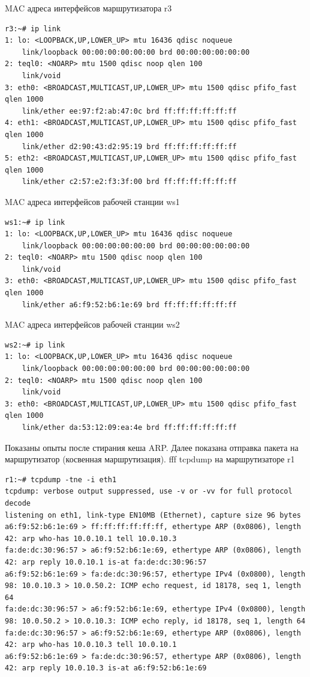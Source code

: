 \documentclass[a4paper,12pt]{article}
\begin{document}
MAC адреса интерфейсов маршрутизатора r3
\begin{Verbatim}
r3:~# ip link
1: lo: <LOOPBACK,UP,LOWER_UP> mtu 16436 qdisc noqueue 
    link/loopback 00:00:00:00:00:00 brd 00:00:00:00:00:00
2: teql0: <NOARP> mtu 1500 qdisc noop qlen 100
    link/void 
3: eth0: <BROADCAST,MULTICAST,UP,LOWER_UP> mtu 1500 qdisc pfifo_fast qlen 1000
    link/ether ee:97:f2:ab:47:0c brd ff:ff:ff:ff:ff:ff
4: eth1: <BROADCAST,MULTICAST,UP,LOWER_UP> mtu 1500 qdisc pfifo_fast qlen 1000
    link/ether d2:90:43:d2:95:19 brd ff:ff:ff:ff:ff:ff
5: eth2: <BROADCAST,MULTICAST,UP,LOWER_UP> mtu 1500 qdisc pfifo_fast qlen 1000
    link/ether c2:57:e2:f3:3f:00 brd ff:ff:ff:ff:ff:ff
\end{Verbatim}

MAC адреса интерфейсов рабочей станции ws1
\begin{Verbatim}
ws1:~# ip link
1: lo: <LOOPBACK,UP,LOWER_UP> mtu 16436 qdisc noqueue 
    link/loopback 00:00:00:00:00:00 brd 00:00:00:00:00:00
2: teql0: <NOARP> mtu 1500 qdisc noop qlen 100
    link/void 
3: eth0: <BROADCAST,MULTICAST,UP,LOWER_UP> mtu 1500 qdisc pfifo_fast qlen 1000
    link/ether a6:f9:52:b6:1e:69 brd ff:ff:ff:ff:ff:ff
\end{Verbatim}

MAC адреса интерфейсов рабочей станции ws2
\begin{Verbatim}
ws2:~# ip link
1: lo: <LOOPBACK,UP,LOWER_UP> mtu 16436 qdisc noqueue 
    link/loopback 00:00:00:00:00:00 brd 00:00:00:00:00:00
2: teql0: <NOARP> mtu 1500 qdisc noop qlen 100
    link/void 
3: eth0: <BROADCAST,MULTICAST,UP,LOWER_UP> mtu 1500 qdisc pfifo_fast qlen 1000
    link/ether da:53:12:09:ea:4e brd ff:ff:ff:ff:ff:ff
\end{Verbatim}

Показаны опыты после стирания кеша ARP.
Далее показана отправка пакета на маршрутизатор (косвенная маршрутизация). 
fff
tcpdump на маршрутизаторе r1
\begin{Verbatim}
r1:~# tcpdump -tne -i eth1
tcpdump: verbose output suppressed, use -v or -vv for full protocol decode
listening on eth1, link-type EN10MB (Ethernet), capture size 96 bytes
a6:f9:52:b6:1e:69 > ff:ff:ff:ff:ff:ff, ethertype ARP (0x0806), length 42: arp who-has 10.0.10.1 tell 10.0.10.3
fa:de:dc:30:96:57 > a6:f9:52:b6:1e:69, ethertype ARP (0x0806), length 42: arp reply 10.0.10.1 is-at fa:de:dc:30:96:57
a6:f9:52:b6:1e:69 > fa:de:dc:30:96:57, ethertype IPv4 (0x0800), length 98: 10.0.10.3 > 10.0.50.2: ICMP echo request, id 18178, seq 1, length 64
fa:de:dc:30:96:57 > a6:f9:52:b6:1e:69, ethertype IPv4 (0x0800), length 98: 10.0.50.2 > 10.0.10.3: ICMP echo reply, id 18178, seq 1, length 64
fa:de:dc:30:96:57 > a6:f9:52:b6:1e:69, ethertype ARP (0x0806), length 42: arp who-has 10.0.10.3 tell 10.0.10.1
a6:f9:52:b6:1e:69 > fa:de:dc:30:96:57, ethertype ARP (0x0806), length 42: arp reply 10.0.10.3 is-at a6:f9:52:b6:1e:69
\end{Verbatim}
\end{document}
